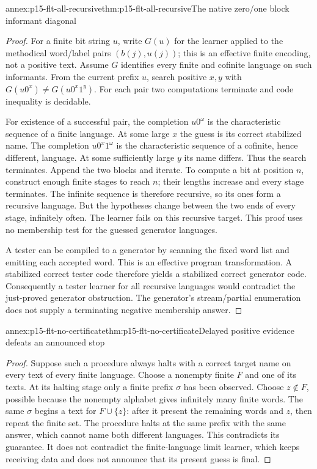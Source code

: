 \begin{annexitem}{annex:p15-flt-all-recursive}{thm:p15-flt-all-recursive}{The native zero/one block informant diagonal}
\begin{proof}
For a finite bit string \(u\), write \(G(u)\) for the
learner applied to the methodical word/label pairs
\((b(j),u(j))\); this is an effective finite encoding,
not a positive text.
Assume \(G\) identifies every finite and cofinite
language on such informants.
From the current prefix \(u\), search positive \(x,y\)
with \(G(u0^x)\ne G(u0^x1^y)\).
For each pair two computations terminate and code
inequality is decidable.

For existence of a successful pair, the completion
\(u0^\omega\) is the characteristic sequence of a
finite language. At some large \(x\) the guess is its
correct stabilized name.
The completion \(u0^x1^\omega\) is the characteristic
sequence of a cofinite, hence different, language.
At some sufficiently large \(y\) its name differs.
Thus the search terminates.
Append the two blocks and iterate.
To compute a bit at position \(n\), construct enough
finite stages to reach \(n\); their lengths increase
and every stage terminates.
The infinite sequence is therefore recursive, so its
ones form a recursive language. But the hypotheses
change between the two ends of every stage, infinitely
often. The learner fails on this recursive target.
This proof uses no membership test for the guessed
generator languages.

A tester can be compiled to a generator by scanning
the fixed word list and emitting each accepted word.
This is an effective program transformation.
A stabilized correct tester code therefore yields a
stabilized correct generator code. Consequently a
tester learner for all recursive languages would
contradict the just-proved generator obstruction.
The generator's stream/partial enumeration does not
supply a terminating negative membership answer.
\end{proof}
\end{annexitem}

\begin{annexitem}{annex:p15-flt-no-certificate}{thm:p15-flt-no-certificate}{Delayed positive evidence defeats an announced stop}
\begin{proof}
Suppose such a procedure always halts with a correct
target name on every text of every finite language.
Choose a nonempty finite \(F\) and one of its texts.
At its halting stage only a finite prefix \(\sigma\)
has been observed.
Choose \(z\notin F\), possible because the nonempty
alphabet gives infinitely many finite words.
The same \(\sigma\) begins a text for \(F\cup\{z\}\):
after it present the remaining words and \(z\), then
repeat the finite set. The procedure halts at the
same prefix with the same answer, which cannot name
both different languages.
This contradicts its guarantee. It does not contradict
the finite-language limit learner, which keeps receiving
data and does not announce that its present guess is final.
\end{proof}
\end{annexitem}
